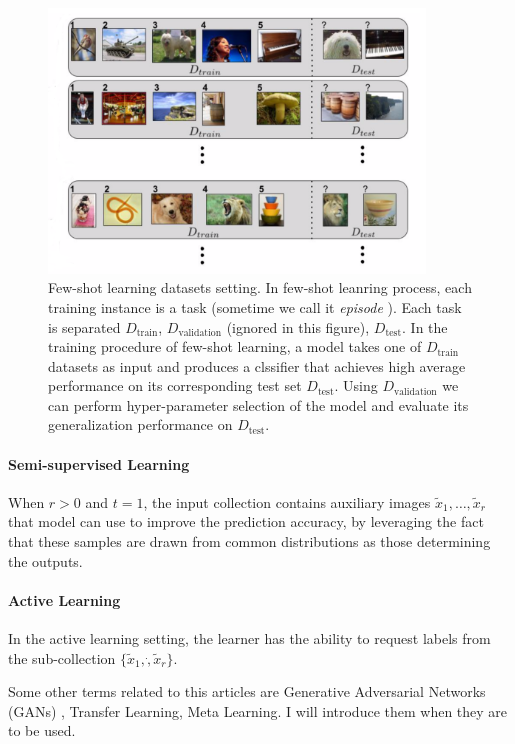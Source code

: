 \documentclass{article}
\begin{document}
\begin{figure}
\centering
\includegraphics[width=10cm]{figures/fewshot}
\caption{Few-shot learning datasets setting. In few-shot leanring process, each training instance is a task (sometime we call it \textit{episode} \cite{vinyals2016matching}). Each task is separated $D_{\text{train}}$, $D_{\text{validation}}$ (ignored in this figure), $D_{\text{test}}$. In the training procedure of few-shot learning, a model takes one of $D_{\text{train}}$ datasets as input and produces a clssifier that achieves high average performance on its corresponding test set $D_{\text{test}}$. Using $D_{\text{validation}}$ we can perform hyper-parameter selection of the model and evaluate its generalization performance on $D_{\text{test}}$.}\label{fig:fewshot}
\end{figure}

\paragraph{Semi-supervised Learning} When $r>0$ and $t=1$, the input collection contains auxiliary images $\tilde{x}_1,\dots,\tilde{x}_r$ that model can use to improve the prediction accuracy, by leveraging the fact that these samples are drawn from common distributions as those determining the outputs.

\paragraph{Active Learning} In the active learning setting, the learner has the ability to request labels from the sub-collection $\{\tilde{x}_1,\dot,\tilde{x}_r \}$.


Some other terms related to this articles are Generative Adversarial Networks (GANs) \cite{goodfellow2014generative}, Transfer Learning, Meta Learning. I will introduce them when they are to be used.
\end{document}
